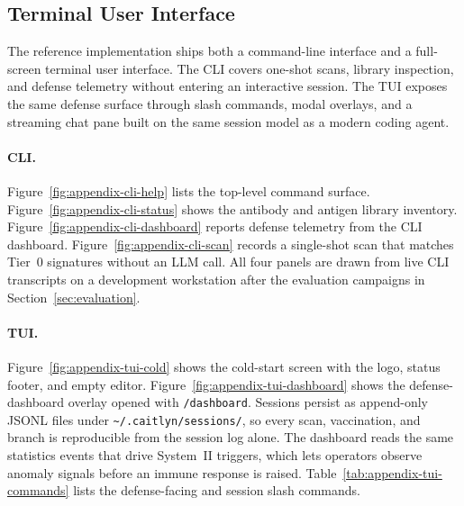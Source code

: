\subsection{Terminal User Interface}
\label{app:tui}

The reference implementation ships both a command-line interface and a
full-screen terminal user interface.
The CLI covers one-shot scans, library inspection, and defense telemetry
without entering an interactive session.
The TUI exposes the same defense surface through slash commands, modal
overlays, and a streaming chat pane built on the same session model as a
modern coding agent.

\paragraph{CLI.}
Figure~\ref{fig:appendix-cli-help} lists the top-level command surface.
Figure~\ref{fig:appendix-cli-status} shows the antibody and antigen library
inventory.
Figure~\ref{fig:appendix-cli-dashboard} reports defense telemetry from the
CLI dashboard.
Figure~\ref{fig:appendix-cli-scan} records a single-shot scan that matches
Tier~0 signatures without an LLM call.
All four panels are drawn from live CLI transcripts on a development
workstation after the evaluation campaigns in
Section~\ref{sec:evaluation}.

\paragraph{TUI.}
Figure~\ref{fig:appendix-tui-cold} shows the cold-start screen with the
logo, status footer, and empty editor.
Figure~\ref{fig:appendix-tui-dashboard} shows the defense-dashboard overlay
opened with \texttt{/dashboard}.
Sessions persist as append-only JSONL files under
\texttt{\textasciitilde/.caitlyn/sessions/}, so every scan, vaccination, and
branch is reproducible from the session log alone.
The dashboard reads the same statistics events that drive System~II
triggers, which lets operators observe anomaly signals before an immune
response is raised.
Table~\ref{tab:appendix-tui-commands} lists the defense-facing and
session slash commands.


